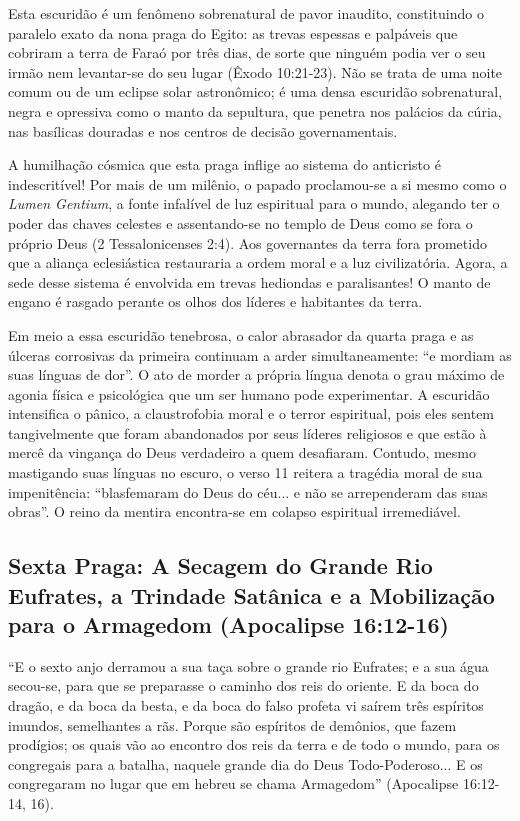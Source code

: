 Esta escuridão é um fenômeno sobrenatural de pavor inaudito, constituindo o paralelo exato da nona praga do Egito: as trevas espessas e palpáveis que cobriram a terra de Faraó por três dias, de sorte que ninguém podia ver o seu irmão nem levantar-se do seu lugar (Êxodo 10:21-23). Não se trata de uma noite comum ou de um eclipse solar astronômico; é uma densa escuridão sobrenatural, negra e opressiva como o manto da sepultura, que penetra nos palácios da cúria, nas basílicas douradas e nos centros de decisão governamentais.

A humilhação cósmica que esta praga inflige ao sistema do anticristo é indescritível! Por mais de um milênio, o papado proclamou-se a si mesmo como o \textit{Lumen Gentium}, a fonte infalível de luz espiritual para o mundo, alegando ter o poder das chaves celestes e assentando-se no templo de Deus como se fora o próprio Deus (2 Tessalonicenses 2:4). Aos governantes da terra fora prometido que a aliança eclesiástica restauraria a ordem moral e a luz civilizatória. Agora, a sede desse sistema é envolvida em trevas hediondas e paralisantes! O manto de engano é rasgado perante os olhos dos líderes e habitantes da terra.

Em meio a essa escuridão tenebrosa, o calor abrasador da quarta praga e as úlceras corrosivas da primeira continuam a arder simultaneamente: ``e mordiam as suas línguas de dor''. O ato de morder a própria língua denota o grau máximo de agonia física e psicológica que um ser humano pode experimentar. A escuridão intensifica o pânico, a claustrofobia moral e o terror espiritual, pois eles sentem tangivelmente que foram abandonados por seus líderes religiosos e que estão à mercê da vingança do Deus verdadeiro a quem desafiaram. Contudo, mesmo mastigando suas línguas no escuro, o verso 11 reitera a tragédia moral de sua impenitência: ``blasfemaram do Deus do céu... e não se arrependeram das suas obras''. O reino da mentira encontra-se em colapso espiritual irremediável.



\subsection{Sexta Praga: A Secagem do Grande Rio Eufrates, a Trindade Satânica e a Mobilização para o Armagedom (Apocalipse 16:12-16)}


``E o sexto anjo derramou a sua taça sobre o grande rio Eufrates; e a sua água secou-se, para que se preparasse o caminho dos reis do oriente. E da boca do dragão, e da boca da besta, e da boca do falso profeta vi saírem três espíritos imundos, semelhantes a rãs. Porque são espíritos de demônios, que fazem prodígios; os quais vão ao encontro dos reis da terra e de todo o mundo, para os congregais para a batalha, naquele grande dia do Deus Todo-Poderoso... E os congregaram no lugar que em hebreu se chama Armagedom'' (Apocalipse 16:12-14, 16).

